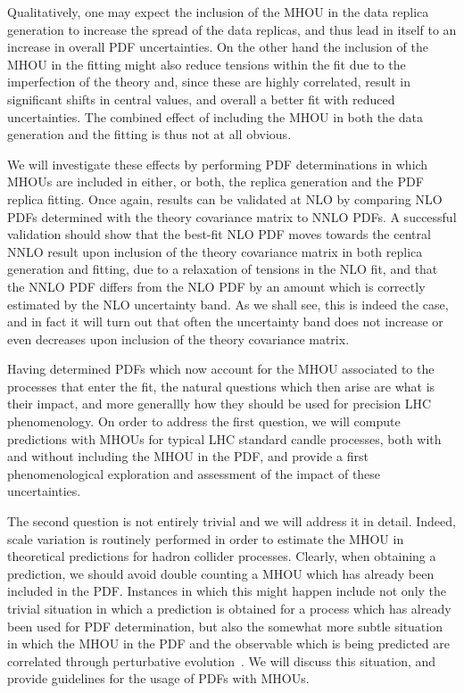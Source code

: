 Qualitatively, one may expect the inclusion of the MHOU in the data replica
generation to increase the spread of the data replicas, and thus lead in 
itself to an increase in overall PDF uncertainties. On the other hand 
the inclusion of the MHOU in the fitting might also  reduce 
tensions within the fit due to the imperfection of the theory and, since 
these are highly correlated, result in significant shifts in central values, 
and overall a better fit with reduced uncertainties. The combined effect
of including the MHOU in both the data generation and the fitting is thus not
at all obvious.

We will investigate these effects by performing PDF determinations in
which MHOUs are included in either, or both, the replica
generation and the PDF replica fitting. Once again, results can be 
validated at NLO by comparing NLO PDFs determined with the theory 
covariance matrix to NNLO PDFs.
%
A successful validation should show that the best-fit NLO PDF moves
towards the central NNLO result upon inclusion of the theory covariance 
matrix in both replica generation and fitting, due to a relaxation of 
tensions in the NLO fit, and that the NNLO PDF differs from the NLO PDF 
by an amount which is correctly estimated by the NLO uncertainty band.
%
As we shall see, this is indeed the case, and in fact it will
turn out that often the uncertainty band does not increase or even decreases 
upon inclusion of the theory covariance matrix.

Having determined PDFs which now account for the MHOU associated
to the processes that enter the fit, the natural
questions which then arise are what is their impact, and more
generallly
how they should be used for precision
LHC phenomenology.
On order to address the first question, we
will compute predictions with MHOUs for typical LHC standard
candle processes, both with and without including the MHOU in the PDF, and
provide a first phenomenological exploration and assessment of the
impact of these uncertainties.

The second  question is not entirely trivial
and we will address it in detail.
%
Indeed, scale variation is
routinely performed in order to estimate the MHOU in theoretical predictions for
hadron collider processes. Clearly, when obtaining a prediction, we
should avoid double counting a
MHOU which has already been included in the PDF.
%
Instances in which
this might happen include not only the trivial situation in which a
prediction is obtained for a process which has already been used for
PDF determination, but also the somewhat more subtle situation in
which the MHOU in the PDF and the observable which is being predicted
are correlated through perturbative
evolution~\cite{Harland-Lang:2018bxd}.
We will discuss this situation, and provide guidelines for the usage of PDFs with MHOUs. 

